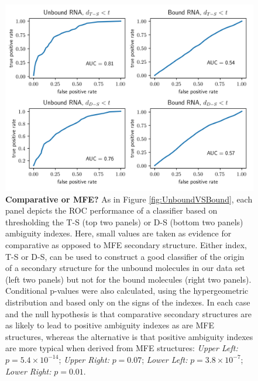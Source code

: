 \begin{figure}[h!]
\centering
\includegraphics[width=\textwidth]{comparative_mfe.png}
\vglue 0.5cm

\caption{{\bf Comparative or MFE?} As in Figure \ref{fig:UnboundVSBound}, each panel
depicts the ROC performance of a classifier based on thresholding the T-S (top two panels) or
D-S (bottom two panels) ambiguity indexes. Here, small values are taken as evidence for
comparative as opposed to MFE secondary structure. Either index, T-S or D-S, can be used to
construct a good classifier of the origin of a secondary structure for the unbound molecules in
our data set (left two panels) but not for the bound molecules (right two panels). Conditional
p-values were also calculated, using the hypergeometric distribution and based only on the signs
of the indexes. In each case and the null hypothesis is that comparative secondary structures are as
likely to lead to positive ambiguity indexes as are MFE structures, whereas the alternative is
that positive ambiguity indexes are more typical when derived from MFE structures:
{\em Upper Left:} $p= 5.4 \times 10^{-14} $; {\em Upper Right:} $p=0.07$; {\em Lower Left:} $p=3.8 \times 10^{-7}$;  {\em Lower Right:} $p=0.01$.}
\label{fig:CompVSMFE}
\end{figure}
